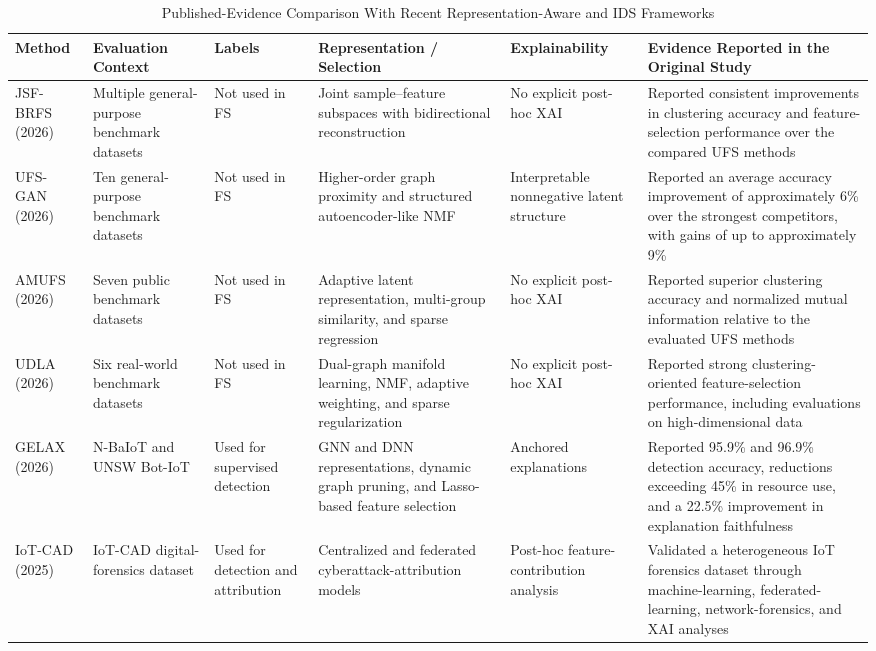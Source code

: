 \begin{table}[t]
\caption{Published-Evidence Comparison With Recent Representation-Aware and IDS Frameworks}
\label{tab:published}
\centering
\footnotesize
\setlength{\tabcolsep}{4pt}
\begin{tabularx}{\textwidth}{@{}>{\raggedright\arraybackslash}p{2.3cm} >{\raggedright\arraybackslash}p{2.4cm} >{\raggedright\arraybackslash}p{1.7cm} >{\raggedright\arraybackslash}X >{\raggedright\arraybackslash}p{2.3cm} >{\raggedright\arraybackslash}X@{}}
\toprule
Method & Evaluation Context & Labels & Representation / Selection & Explainability & Evidence Reported in the Original Study \\
\midrule
JSF-BRFS (2026) \cite{maleknia2026joint} & Multiple general-purpose benchmark datasets & Not used in FS & Joint sample--feature subspaces with bidirectional reconstruction & No explicit post-hoc XAI & Reported consistent improvements in clustering accuracy and feature-selection performance over the compared UFS methods \\
UFS-GAN (2026) \cite{pakmanesh2026unsupervised} & Ten general-purpose benchmark datasets & Not used in FS & Higher-order graph proximity and structured autoencoder-like NMF & Interpretable nonnegative latent structure & Reported an average accuracy improvement of approximately 6\% over the strongest competitors, with gains of up to approximately 9\% \\
AMUFS (2026) \cite{gao2026unsupervised} & Seven public benchmark datasets & Not used in FS & Adaptive latent representation, multi-group similarity, and sparse regression & No explicit post-hoc XAI & Reported superior clustering accuracy and normalized mutual information relative to the evaluated UFS methods \\
UDLA (2026) \cite{wang2026unsupervised} & Six real-world benchmark datasets & Not used in FS & Dual-graph manifold learning, NMF, adaptive weighting, and sparse regularization & No explicit post-hoc XAI & Reported strong clustering-oriented feature-selection performance, including evaluations on high-dimensional data \\
GELAX (2026) \cite{esmaeilyfard2026gelax} & N-BaIoT and UNSW Bot-IoT & Used for supervised detection & GNN and DNN representations, dynamic graph pruning, and Lasso-based feature selection & Anchored explanations & Reported 95.9\% and 96.9\% detection accuracy, reductions exceeding 45\% in resource use, and a 22.5\% improvement in explanation faithfulness \\
IoT-CAD (2025) \cite{mohamed2025iot} & IoT-CAD digital-forensics dataset & Used for detection and attribution & Centralized and federated cyberattack-attribution models & Post-hoc feature-contribution analysis & Validated a heterogeneous IoT forensics dataset through machine-learning, federated-learning, network-forensics, and XAI analyses \\

\end{tabularx}
\end{table}
